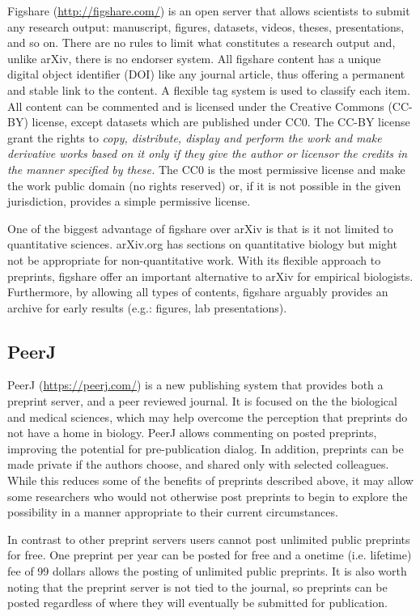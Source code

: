\documentclass[letterpaper,twocolumn,superscriptaddress,showkeys]{revtex4-1}
\begin{document}
Figshare (\href{http://figshare.com/}{http://figshare.com/}) is an open server
that allows scientists to submit any research output: manuscript, figures,
datasets, videos, theses, presentations, and so on. There are no rules to limit
what constitutes a research output and, unlike arXiv, there is no endorser
system. All figshare content has a unique digital object identifier (DOI) like
any journal article, thus offering a permanent and stable link to the content.
A flexible tag system is used to classify each item. All content can be
commented and is licensed under the Creative Commons (CC-BY) license, except
datasets which are published under CC0. The CC-BY license grant the rights to
\emph{copy, distribute, display and perform the work and make derivative works
based on it only if they give the author or licensor the credits in the manner
specified by these.} The CC0 is the most permissive license and make the work
public domain (no rights reserved) or, if it is not possible in the given
jurisdiction, provides a simple permissive license.

One of the biggest advantage of figshare over arXiv is that is it not limited to
quantitative sciences. arXiv.org has sections on quantitative biology but might
not be appropriate for non-quantitative work. With its flexible approach to
preprints, figshare offer an important alternative to arXiv for empirical
biologists. Furthermore, by allowing all types of contents, figshare arguably
provides an archive for early results (e.g.: figures, lab presentations).

\subsection{PeerJ}

PeerJ (\href{https://peerj.com/}{https://peerj.com/}) is a new publishing
system that provides both a preprint server, and a peer reviewed journal.
It is focused on the the biological and medical sciences, which may help
overcome the perception that preprints do not have a home in biology.
PeerJ allows commenting on posted preprints, improving the potential
for pre-publication dialog. In addition, preprints can be made private if
the authors choose, and shared only with selected colleagues. While this
reduces some of the benefits of preprints described above, it may allow
some researchers who would not otherwise post preprints to begin to explore
the possibility in a manner appropriate to their current circumstances.

In contrast to other preprint servers users cannot post unlimited public
preprints for free. One preprint per year can be posted for free and a
onetime (i.e. lifetime) fee of 99 dollars allows the posting of unlimited
public preprints. It is also worth noting that the preprint server is not
tied to the journal, so preprints can be posted regardless of where they
will eventually be submitted for publication.
\end{document}
